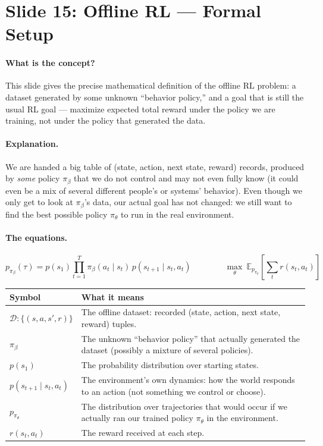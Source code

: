 \documentclass[11pt]{article}
\begin{document}
\section{Slide 15: Offline RL --- Formal Setup}

\paragraph{What is the concept?}
This slide gives the precise mathematical definition of the offline RL problem: a
dataset generated by some unknown ``behavior policy,'' and a goal that is still the
usual RL goal --- maximize expected total reward under the policy we are training, not
under the policy that generated the data.

\paragraph{Explanation.}
We are handed a big table of (state, action, next state, reward) records, produced by
\emph{some} policy $\pi_\beta$ that we do not control and may not even fully know (it
could even be a mix of several different people's or systems' behavior). Even though we
only get to look at $\pi_\beta$'s data, our actual goal has not changed: we still want to
find the best possible policy $\pi_\theta$ to run in the real environment.

\paragraph{The equations.}
$$p_{\pi_\beta}(\tau) = p(s_1)\prod_{t=1}^{T}\pi_\beta(a_t\mid s_t)\,p(s_{t+1}\mid s_t,a_t)
\qquad\qquad
\max_\theta\ \mathbb{E}_{p_{\pi_\theta}}\left[\sum_t r(s_t,a_t)\right]$$

\begin{center}
\begin{tabular}{@{}p{3.2cm}p{10.3cm}@{}}
\toprule
Symbol & What it means \\
\midrule
$\mathcal{D}: \{(s,a,s',r)\}$ & The offline dataset: recorded (state, action, next
state, reward) tuples. \\
$\pi_\beta$ & The unknown ``behavior policy'' that actually generated the dataset
(possibly a mixture of several policies). \\
$p(s_1)$ & The probability distribution over starting states. \\
$p(s_{t+1}\mid s_t,a_t)$ & The environment's own dynamics: how the world responds to an
action (not something we control or choose). \\
$p_{\pi_\theta}$ & The distribution over trajectories that would occur if we actually ran
our trained policy $\pi_\theta$ in the environment. \\
$r(s_t,a_t)$ & The reward received at each step. \\
\bottomrule
\end{tabular}
\end{center}
\end{document}
